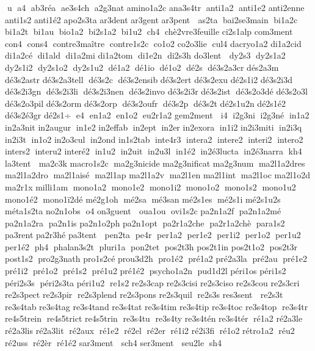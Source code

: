 u  a4  ab3réa  ae3s4ch  a2g3nat 
 amino1a2c 	 ana3s4tr  anti1a2  anti1e2 
 anti2enne  anti1s2 	 anti1é2 	 apo2s3ta 	 ar3dent  	 ar3gent  	 ar3pent   as2ta  bai2se3main  bi1a2c  bi1a2t  bi1au  bio1a2  bi2s1a2  bi1u2  ch4  chè2vre3feuille 	 ci2s1alp 
 com3ment   con4  cons4  contre3maître  contre1s2c  co1o2 	 co2o3lie  cul4 
 dacryo1a2 	 di1a2cid 	 di1a2cé  di1ald  di1a2mi 	 di1a2tom  di1e2n  di2s3h 	 do3lent   dy2s3  dy2s1a2  dy2s1i2  dy2s1o2  dy2s1u2  dé1a2  dé1io  dé1o2  dé2s  dé3s2a3cr 	 dés2a3m  dé3s2astr 
 dé3s2a3tell  dé3s2c  dé3s2ensib 
 dé3s2ert 
 dé3s2exu 	 dé2s1i2 
 dé3s2i3d  dé3s2i3gn  dé3s2i3li  dé3s2i3nen  dé3s2invo 
 dé3s2i3r 
 dé3s2ist  dé3s2o3dé 
 dé3s2o3l  dé3s2o3pil 
 dé3s2orm 
 dé3s2orp  dé3s2oufr  dé3s2p  dé3s2t 
 dé2s1u2n 
 dé2s1é2  dé3s2é3gr 	 dé2s1÷  e4  en1a2  en1o2  eu2r1a2 
 gem2ment   i4  i2g3ni  i2g3né  in1a2 	 in2a3nit 	 in2augur  in1e2 	 in2effab  in2ept  in2er 	 in2exora  in1i2 
 in2i3miti  in2i3q  in2i3t  in1o2 	 in2o3cul  in2ond 	 in1s2tab  inte4r3  intera2  intere2  interi2  intero2  inters2  interu2 	 interé2  in1u2  in2uit  in2u3l  in1é2  in2é3lucta  in2é3narra  kh4 	 la3tent   ma2c3k 
 macro1s2c  ma2g3nicide 
 ma2g3nificat 	 ma2g3num  ma2l1a2dres  ma2l1a2dro  ma2l1aisé  ma2l1ap 	 ma2l1a2v  ma2l1en 	 ma2l1int  ma2l1oc 	 ma2l1o2d  ma2r1x 	 milli1am  mono1a2  mono1e2  mono1i2  mono1o2  mono1s2  mono1u2 	 mono1é2  mono1ï2dé 	 mé2g1oh  mé2sa  mé3san 	 mé2s1es  mé2s1i 
 mé2s1u2s  méta1s2ta 	 no2n1obs  o4 
 on3guent   oua1ou  ovi1s2c 	 pa2n1a2f  pa2n1a2mé 
 pa2n1a2ra  pa2n1is 
 pa2n1o2ph 	 pa2n1opt  pa2r1a2che  pa2r1a2chè  para1s2 	 pa3rent  	 pa2r3hé 	 pa3tent   pen2ta  pe4r  per1a2  per1e2  per1i2  per1o2  per1u2  per1é2  ph4  phalan3s2t  pluri1a  pon2tet  pos2t3h 	 pos2t1in 	 pos2t1o2  pos2t3r  post1s2  pro2g3nath 
 pro1s2cé 	 prou3d2h  pro1é2  pré1a2 
 pré2a3la  pré2au  pré1e2  pré1i2  pré1o2  pré1s2  pré1u2 	 pré1é2  psycho1a2n  pud1d2l 	 péri1os 	 péri1s2 
 péri2s3s  péri2s3ta 	 péri1u2  re1s2 	 re2s3cap 
 re2s3cisi 
 re2s3ciso 	 re2s3cou 	 re2s3cri 
 re2s3pect 	 re2s3pir  re2s3plend 
 re2s3pons 
 re2s3quil  re2s3s 
 res3sent   re2s3t 	 re3s4tab 	 re3s4tag 
 re3s4tand 	 re3s4tat 	 re3s4tim 	 re3s4tip 	 re3s4toc 	 re3s4top  re3s4tr  re4s5trein  re4s5trict 
 re4s5trin  re3s4tu  re3s4ty 
 re3s4tén 
 re3s4tér  ré1a2 	 ré2a3le 
 ré2a3lis 
 ré2a3lit  ré2aux  ré1e2  ré2el  ré2er  ré1i2 	 ré2i3fi  ré1o2 
 rétro1a2  réu2  ré2uss  ré2èr  ré1é2 
 sar3ment   sch4 
 ser3ment   seu2le  sh4 
